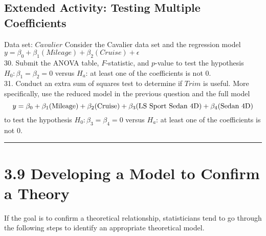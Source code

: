 \documentclass[
]{report}
\begin{document}
\subsection*{Extended Activity: Testing Multiple Coefficients}\label{extended-activity-testing-multiple-coefficients}

Data set: \(Cavalier\)
Consider the Cavalier data set and the regression model \(y = \beta_0 + \beta_1(Mileage) + \beta_2(Cruise) + \epsilon\)\\
30. Submit the ANOVA table, \(F\)-statistic, and \(p\)-value to test the hypothesis \(H_0: \beta_1 = \beta_2 = 0\) versus \(H_a\): at least one of the coefficients is not 0.\\
31. Conduct an extra sum of squares test to determine if \(Trim\) is useful. More specifically, use the reduced model in the previous question and the full model
\begin{equation}
y = \beta_0 + \beta_1(\text{Mileage}) + \beta_2(\text{Cruise}) + \beta_3(\text{LS Sport Sedan 4D}) + \beta_4(\text{Sedan 4D}) \notag
\end{equation}
to test the hypothesis \(H_0: \beta_3 = \beta_4 = 0\) versus \(H_a\): at least one of the coefficients is not 0.

\begin{center}\rule{0.5\linewidth}{0.5pt}\end{center}

\section{3.9 Developing a Model to Confirm a Theory}\label{developing-a-model-to-confirm-a-theory}

If the goal is to confirm a theoretical relationship, statisticians tend to go through the following steps to identify an appropriate theoretical model.
\end{document}
